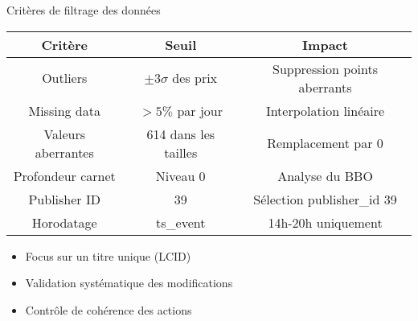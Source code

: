 \documentclass[aspectratio=169]{beamer}  %
\begin{document}
\begin{frame}{Critères de filtrage des données}
    \begin{table}
    \centering
    \begin{tabular}{|c|c|c|}
    \hline
    \textbf{Critère} & \textbf{Seuil} & \textbf{Impact} \\ \hline
    Outliers & $\pm3\sigma$ des prix & Suppression points aberrants \\ \hline
    Missing data & $>5\%$ par jour & Interpolation linéaire \\ \hline
    Valeurs aberrantes & 614 dans les tailles & Remplacement par 0 \\ \hline
    Profondeur carnet & Niveau 0 & Analyse du BBO \\ \hline
    Publisher ID & 39 & Sélection publisher\_id 39 \\ \hline
    Horodatage & ts\_event & 14h-20h uniquement \\ \hline
    \end{tabular}
    \end{table}
    \vspace{0.3cm}
    \begin{itemize}
        \item Focus sur un titre unique (LCID)
        \item Validation systématique des modifications
        \item Contrôle de cohérence des actions
    \end{itemize}
\end{frame}
\end{document}
